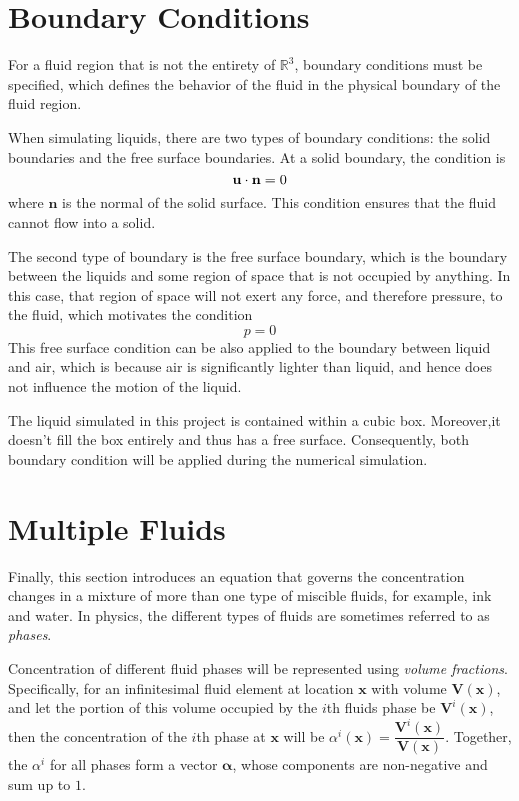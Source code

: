 \section{Boundary Conditions}
\label{section boundary conditions}
For a fluid region that is not the entirety of $\mathbb{R}^3$, boundary conditions must be specified, which defines the behavior of the fluid in the physical boundary of the fluid region.

When simulating liquids, there are two types of boundary conditions: the solid boundaries and the free surface boundaries. At a solid boundary, the condition is 
$$
    \textbf{u} \cdot \textbf{n} = 0
$$
where $\textbf{n}$ is the normal of the solid surface. This condition ensures that the fluid cannot flow into a solid. 

The second type of boundary is the free surface boundary, which is the boundary between the liquids and some region of space that is not occupied by anything. In this case, that region of space will not exert any force, and therefore pressure, to the fluid, which motivates the condition
$$
p = 0
$$
This free surface condition can be also applied to the boundary between liquid and air, which is because air is significantly lighter than liquid, and hence does not influence the motion of the liquid.

The liquid simulated in this project is contained within a cubic box. Moreover,it doesn't fill the box entirely and thus has a free surface. Consequently, both boundary condition will be applied during the numerical simulation. 

\section{Multiple Fluids}
\label{section multiple fluids}
Finally, this section introduces an equation that governs the concentration changes in a mixture of more than one type of miscible fluids, for example, ink and water. In physics, the different types of fluids are sometimes referred to as \textit{phases}.

Concentration of different fluid phases will be represented using \textit{volume fractions}. Specifically, for an infinitesimal fluid element at location $\textbf{x}$ with volume $\textbf{V}(\textbf{x})$, and let the portion of this volume occupied by the $i$th fluids phase be $\textbf{V}^i(\textbf{x})$, then the concentration of the $i$th phase at $\textbf{x}$ will be $\alpha^i(\textbf{x}) = \dfrac{\textbf{V}^i(\textbf{x})}{\textbf{V}(\textbf{x})}$. Together, the $\alpha^i$ for all phases form a vector $\bm{\alpha}$, whose components are non-negative and sum up to $1$.

